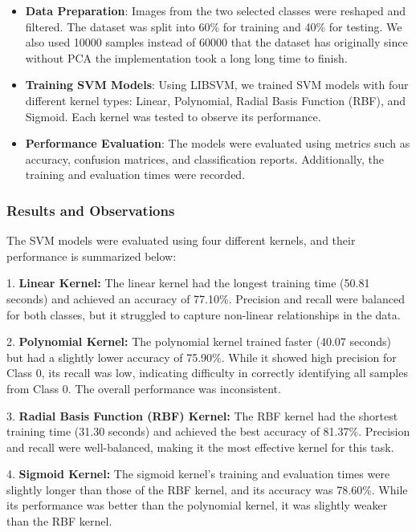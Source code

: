 \documentclass[lettersize,journal]{IEEEtran}
\begin{document}
\begin{itemize}
    \item \textbf{Data Preparation}: Images from the two selected classes were reshaped and filtered. The dataset was split into 60\% for training and 40\% for testing. We also used 10000 samples instead of 60000 that the dataset has originally since without PCA the implementation took a long long time to finish.
    \item \textbf{Training SVM Models}: Using LIBSVM, we trained SVM models with four different kernel types: Linear, Polynomial, Radial Basis Function (RBF), and Sigmoid. Each kernel was tested to observe its performance.
    \item \textbf{Performance Evaluation}: The models were evaluated using metrics such as accuracy, confusion matrices, and classification reports. Additionally, the training and evaluation times were recorded.
\end{itemize}

\vspace{0.5cm}

\subsubsection{\textbf{Results and Observations}}
The SVM models were evaluated using four different kernels, and their performance is summarized below:

1. \textbf{Linear Kernel:}  
   The linear kernel had the longest training time (50.81 seconds) and achieved an accuracy of 77.10\%. Precision and recall were balanced for both classes, but it struggled to capture non-linear relationships in the data.

2. \textbf{Polynomial Kernel:}  
   The polynomial kernel trained faster (40.07 seconds) but had a slightly lower accuracy of 75.90\%. While it showed high precision for Class 0, its recall was low, indicating difficulty in correctly identifying all samples from Class 0. The overall performance was inconsistent.

3. \textbf{Radial Basis Function (RBF) Kernel:}  
   The RBF kernel had the shortest training time (31.30 seconds) and achieved the best accuracy of 81.37\%. Precision and recall were well-balanced, making it the most effective kernel for this task.

4. \textbf{Sigmoid Kernel:}  
   The sigmoid kernel's training and evaluation times were slightly longer than those of the RBF kernel, and its accuracy was 78.60\%. While its performance was better than the polynomial kernel, it was slightly weaker than the RBF kernel.
\end{document}
